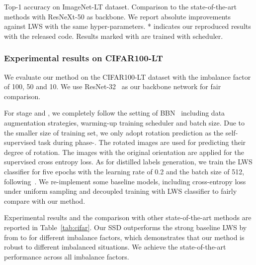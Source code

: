\documentclass[10pt,twocolumn,letterpaper]{article}
\begin{document}
\begin{table}[t]
\caption{Top-1 accuracy on ImageNet-LT dataset. Comparison to the state-of-the-art methods with ResNeXt-50 as backbone. We report absolute improvements against LWS with the same hyper-parameters. * indicates our reproduced results with the released code. Results marked with \ddag are trained with  scheduler.}
\vspace{-1em}
\label{tab:ImageNet}
\end{table}

\subsubsection{Experimental results on CIFAR100-LT}

We evaluate our method on the CIFAR100-LT dataset with the imbalance factor of 100, 50 and 10. We use ResNet-32~\cite{resnet} as our backbone network for fair comparison.

For stage \uppercase\expandafter{} and \uppercase\expandafter{}, we completely follow the setting of BBN~\cite{bbn} including data augmentation strategies, warming-up training scheduler and batch size. Due to the smaller size of training set, we only adopt rotation prediction as the self-supervised task during phase-\uppercase\expandafter{}. The rotated images are used for predicting their degree of rotation. The images with the original orientation are applied for the supervised cross entropy loss. As for distilled labels generation, we train the LWS classifier for five epochs with the learning rate of 0.2 and the batch size of 512, following~\cite{decoupling}. We re-implement some baseline models, including cross-entropy loss under uniform sampling and decoupled training with LWS classifier to fairly compare with our method.

Experimental results and the comparison with other state-of-the-art methods are reported in Table~\ref{tab:cifar}. Our SSD outperforms the strong baseline LWS by from   to  for different imbalance factors, which demonstrates that our method is robust to different imbalanced situations. We achieve the state-of-the-art performance across all imbalance factors.
\end{document}
